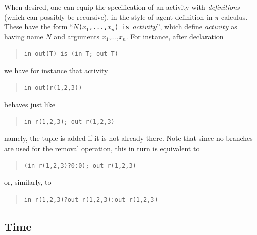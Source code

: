 \documentclass[12pt,a4paper,twoside,openright]{book}
\begin{document}
When desired, one can equip the specification of an activity with \emph{definitions} (which can possibly be recursive), in the style of agent definition in $\pi$-calculus.
%
These have the form ``\texttt{$N$($x_1$,...,$x_n$) is $\mathit{activity}$}'', which define $\mathit{activity}$ as having name $N$ and arguments  $x_1$,$\ldots$,$x_n$.
%
For instance, after declaration
%
{\begin{quote}
\begin{verbatim}
in-out(T) is (in T; out T)
\end{verbatim}\end{quote}
}
\noindent we have for instance that activity
{\begin{quote}
\begin{verbatim}
in-out(r(1,2,3))
\end{verbatim}\end{quote}
}
\noindent
behaves just like 
{\begin{quote}
\begin{verbatim}
in r(1,2,3); out r(1,2,3)
\end{verbatim}\end{quote}
}
\noindent
namely, the tuple is added if it is not already there.
%
Note that since no branches are used for the removal operation, this in turn is equivalent to
{\begin{quote}
\begin{verbatim}
(in r(1,2,3)?0:0); out r(1,2,3)
\end{verbatim}\end{quote}
}
\noindent
or, similarly, to 
{\begin{quote}
\begin{verbatim}
in r(1,2,3)?out r(1,2,3):out r(1,2,3)
\end{verbatim}\end{quote}
}

\subsection{Time}
\end{document}
